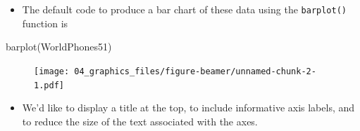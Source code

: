 \documentclass[
  9pt,
  a4paper,
  ignorenonframetext,
  notheorems]{beamer}
\newenvironment{Shaded}{\begin{snugshade}}{\end{snugshade}}
\newcommand{\FunctionTok}[1]{\textcolor[rgb]{0.28,0.35,0.67}{#1}}
\newcommand{\NormalTok}[1]{\textcolor[rgb]{0.00,0.23,0.31}{#1}}
\providecommand{\tightlist}{%
  \setlength{\itemsep}{0pt}\setlength{\parskip}{0pt}}\usepackage{longtable,booktabs,array}
\begin{document}
\begin{frame}[fragile]
\begin{itemize}
\tightlist
\item
  The default code to produce a bar chart of these data using the
  \texttt{barplot()} function is
\end{itemize}

\begin{Shaded}
\begin{Highlighting}[]
\FunctionTok{barplot}\NormalTok{(WorldPhones51)}
\end{Highlighting}
\end{Shaded}

\begin{figure}

{\centering \texttt{[image: 04\_graphics\_files/figure-beamer/unnamed-chunk-2-1.pdf]}

}

\end{figure}

\begin{itemize}
\tightlist
\item
  We'd like to display a title at the top, to include informative axis
  labels, and to reduce the size of the text associated with the axes.
\end{itemize}
\end{frame}
\end{document}
